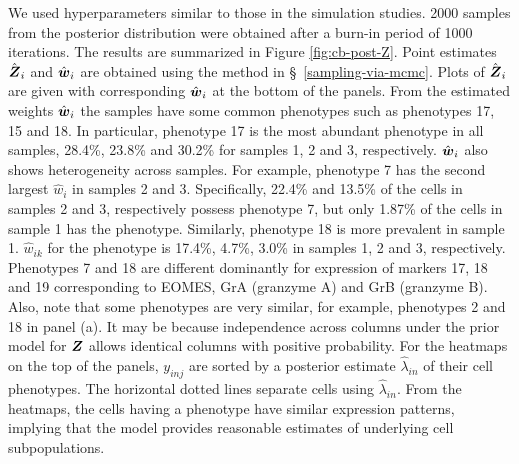 \documentclass[12pt,]{article}
\newcommand{\bZ}{\mbox{\boldmath $Z$}}
\newcommand{\bw}{\mbox{\boldmath $w$}}
\begin{document}
We used hyperparameters similar to those in the simulation studies.  2000
samples from the posterior distribution were obtained after a burn-in period of
1000 iterations. The results are summarized in Figure \ref{fig:cb-post-Z}.
Point estimates $\hat{\bZ}_i$ and $\hat{\bw}_i$ are obtained using the method
in \S~\ref{sampling-via-mcmc}.
Plots of $\hat{\bZ}_i$ are given with corresponding $\hat{\bw}_i$ at the bottom
of the panels.  From the estimated weights $\hat{\bw}_i$ the samples have some
common phenotypes such as phenotypes 17, 15 and 18.  In particular, phenotype
17 is the most abundant phenotype in all samples, 28.4\%, 23.8\% and 30.2\% for
samples 1, 2 and 3, respectively.  $\hat{\bw}_i$ also shows heterogeneity
across samples.  For example, phenotype 7 has the second largest $\hat{w}_i$ in
samples 2 and 3. Specifically, 22.4\% and 13.5\% of the cells in samples 2 and
3, respectively possess phenotype 7, but only 1.87\% of the cells in sample 1
has the phenotype.  Similarly, phenotype 18 is more prevalent in sample 1.
$\hat{w}_{ik}$ for the phenotype is 17.4\%, 4.7\%, 3.0\% in samples 1, 2 and 3,
respectively.  Phenotypes 7 and 18 are different dominantly for expression of
markers 17, 18 and 19 corresponding to EOMES, GrA (granzyme A) and GrB
(granzyme B).  Also, note that some phenotypes are very similar, for example,
phenotypes 2 and 18 in panel (a).  It may be because independence across
columns under the prior model for $\bZ$ allows identical columns with positive
probability.  For the heatmaps on the top of the panels, $y_{inj}$ are sorted
by a posterior estimate $\hat{\lambda}_{in}$ of their cell phenotypes. The
horizontal dotted lines separate cells using $\hat{\lambda}_{in}$.  From the
heatmaps, the cells having a phenotype have similar expression patterns,
implying that the model provides reasonable estimates of underlying cell
subpopulations.

\end{document}
